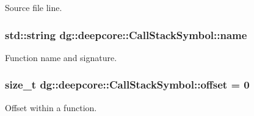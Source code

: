 Source file line. 

\subsubsection[{\texorpdfstring{name}{name}}]{\setlength{\rightskip}{0pt plus 5cm}std\+::string dg\+::deepcore\+::\+Call\+Stack\+Symbol\+::name}\hypertarget{structdg_1_1deepcore_1_1_call_stack_symbol_a6792f8a2df6115a99a1d4fd44c6fafff}{}\label{structdg_1_1deepcore_1_1_call_stack_symbol_a6792f8a2df6115a99a1d4fd44c6fafff}


Function name and signature. 

\subsubsection[{\texorpdfstring{offset}{offset}}]{\setlength{\rightskip}{0pt plus 5cm}size\+\_\+t dg\+::deepcore\+::\+Call\+Stack\+Symbol\+::offset = 0}\hypertarget{structdg_1_1deepcore_1_1_call_stack_symbol_a47e23cb3fa667d087a9630017cc478ce}{}\label{structdg_1_1deepcore_1_1_call_stack_symbol_a47e23cb3fa667d087a9630017cc478ce}


Offset within a function. 

